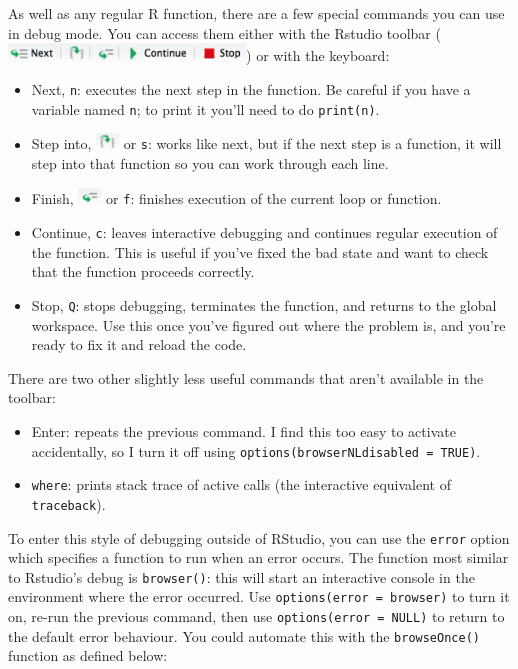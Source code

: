 As well as any regular R function, there are a few special commands you
can use in debug mode. You can access them either with the Rstudio
toolbar (\includegraphics[width=2.48in]{screenshots/debug-toolbar.png})
or with the keyboard:

\begin{itemize}
\item
  Next, \texttt{n}: executes the next step in the function. Be careful
  if you have a variable named \texttt{n}; to print it you'll need to do
  \texttt{print(n)}.
\item
  Step into, \includegraphics[width=0.24in]{screenshots/step-into.png}
  or \texttt{s}: works like next, but if the next step is a function, it
  will step into that function so you can work through each line.
\item
  Finish, \includegraphics[width=0.24in]{screenshots/finish-loop.png} or
  \texttt{f}: finishes execution of the current loop or function.
\item
  Continue, \texttt{c}: leaves interactive debugging and continues
  regular execution of the function. This is useful if you've fixed the
  bad state and want to check that the function proceeds correctly.
\item
  Stop, \texttt{Q}: stops debugging, terminates the function, and
  returns to the global workspace. Use this once you've figured out
  where the problem is, and you're ready to fix it and reload the code.
\end{itemize}

There are two other slightly less useful commands that aren't available
in the toolbar:

\begin{itemize}
\item
  Enter: repeats the previous command. I find this too easy to activate
  accidentally, so I turn it off using
  \texttt{options(browserNLdisabled = TRUE)}.
\item
  \texttt{where}: prints stack trace of active calls (the interactive
  equivalent of \texttt{traceback}).
\end{itemize}

To enter this style of debugging outside of RStudio, you can use the
\texttt{error} option which specifies a function to run when an error
occurs. The function most similar to Rstudio's debug is
\texttt{browser()}: this will start an interactive console in the
environment where the error occurred. Use
\texttt{options(error = browser)} to turn it on, re-run the previous
command, then use \texttt{options(error = NULL)} to return to the
default error behaviour. You could automate this with the
\texttt{browseOnce()} function as defined below: 

